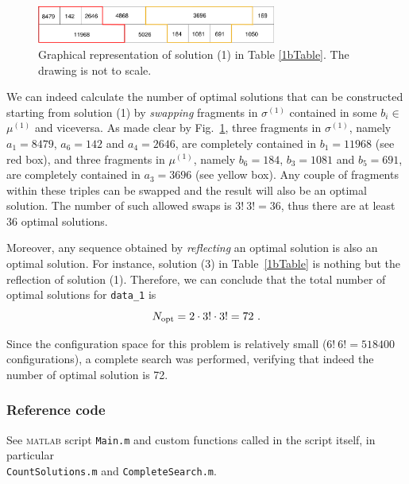 \documentclass[12pt,A4,titlepage]{article}
\begin{document}
\begin{figure}[H]
\centering
\includegraphics[width=0.7\textwidth]{Figures/blocks.pdf}
\caption{\footnotesize Graphical representation of solution (1) in Table \ref{1bTable}. The drawing is not to scale.}
\label{1bFig}
\end{figure}

\vspace*{-0.2cm}
We can indeed calculate the number of optimal solutions that can be constructed starting from solution (1) by \emph{swapping} fragments in $\sigma^{(1)}$ contained in some $b_i \in$ $\mu^{(1)}$ and viceversa. As made clear by Fig.~\ref{1bFig}, three fragments in $\sigma^{(1)}$, namely $a_1 = 8479$, $a_6 = 142$ and $a_4 = 2646$, are completely contained in $b_1 = 11968$ (see red box), and three fragments in $\mu^{(1)}$, namely $b_6 = 184$, $b_3 = 1081$ and $b_5 = 691$, are completely contained in $a_3 = 3696$ (see yellow box). Any couple of fragments within these triples can be swapped and the result will also be an optimal solution. The number of such allowed swaps is $3! \ 3! = 36$, thus there are at least $36$ optimal solutions.

Moreover, any sequence obtained by \emph{reflecting} an optimal solution is also an optimal solution. For instance, solution (3) in Table~\ref{1bTable} is nothing but the reflection of solution (1). Therefore, we can conclude that the total number of optimal solutions for \texttt{data\_1} is 
\vspace*{-0.1cm}\[
N_{\textup{opt}} = 2 \cdot 3! \cdot 3! = 72 \ .
\]

\vspace*{-0.1cm}
Since the configuration space for this problem is relatively small ($6! \ 6! = 518400$ configurations), a complete search was performed, verifying that indeed the number of optimal solution is 72.

\vspace*{-0.2cm}
\subsubsection*{Reference code}
See \textsc{matlab} script \verb!Main.m! and custom functions called in the script itself, in particular\\ \verb!CountSolutions.m! and \texttt{CompleteSearch.m}.
\end{document}
